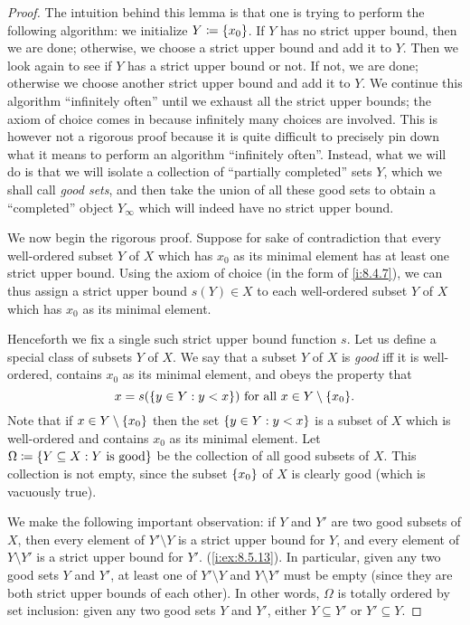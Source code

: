 \begin{proof}
  The intuition behind this lemma is that one is trying to perform the following algorithm:
  we initialize \(Y \coloneqq \left\lbrace x_0\right\rbrace\).
  If \(Y\) has no strict upper bound, then we are done;
  otherwise, we choose a strict upper bound and add it to \(Y\).
  Then we look again to see if \(Y\) has a strict upper bound or not.
  If not, we are done;
  otherwise we choose another strict upper bound and add it to \(Y\).
  We continue this algorithm ``infinitely often'' until we exhaust all the strict upper bounds;
  the axiom of choice comes in because infinitely many choices are involved.
  This is however not a rigorous proof because it is quite difficult to precisely pin down what it means to perform an algorithm ``infinitely often''.
  Instead, what we will do is that we will isolate a collection of ``partially completed'' sets \(Y\), which we shall call \emph{good sets}, and then take the union of all these good sets to obtain a ``completed'' object \(Y_{\infty}\) which will indeed have no strict upper bound.

  We now begin the rigorous proof.
  Suppose for sake of contradiction that every well-ordered subset \(Y\) of \(X\) which has \(x_0\) as its minimal element has at least one strict upper bound.
  Using the axiom of choice (in the form of \cref{i:8.4.7}), we can thus assign a strict upper bound \(s(Y) \in X\) to each well-ordered subset \(Y\) of \(X\) which has \(x_0\) as its minimal element.

  Henceforth we fix a single such strict upper bound function \(s\).
  Let us define a special class of subsets \(Y\) of \(X\).
  We say that a subset \(Y\) of \(X\) is \emph{good} iff it is well-ordered, contains \(x_0\) as its minimal element, and obeys the property that
  \[
    x = s(\set{y \in Y : y < x}) \text{ for all } x \in Y \setminus \set{x_0}.
  \]
  Note that if \(x \in Y \setminus \left\lbrace x_0\right\rbrace\) then the set \(\left\lbrace y \in Y : y < x\right\rbrace\) is a subset of \(X\) which is well-ordered and contains \(x_0\) as its minimal element.
  Let \(\Omega \coloneqq \left\lbrace Y \subseteq X : Y \text{ is good}\right\rbrace\) be the collection of all good subsets of \(X\).
  This collection is not empty, since the subset \(\left\lbrace x_0\right\rbrace\) of \(X\) is clearly good
  (which is vacuously true).

  We make the following important observation:
  if \(Y\) and \(Y'\) are two good subsets of \(X\), then every element of \(Y' \setminus Y\) is a strict upper bound for \(Y\), and every element of \(Y \setminus Y'\) is a strict upper bound for \(Y'\).
  (\cref{i:ex:8.5.13}).
  In particular, given any two good sets \(Y\) and \(Y'\), at least one of \(Y' \setminus Y\) and \(Y \setminus Y'\) must be empty
  (since they are both strict upper bounds of each other).
  In other words, \(\Omega\) is totally ordered by set inclusion:
  given any two good sets \(Y\) and \(Y'\), either \(Y \subseteq Y'\) or \(Y' \subseteq Y\).


\end{proof}
